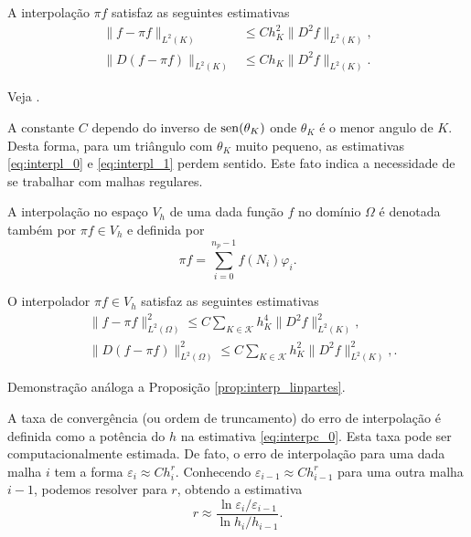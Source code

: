 \begin{prop}\label{prop:interpl}
  A interpolação $\pi f$ satisfaz as seguintes estimativas
  \begin{align}
    \|f - \pi f\|_{L^2(K)} &\leq Ch_K^2\|D^2f\|_{L^2(K)},\label{eq:interpl_0}\\
    \|D(f - \pi f)\|_{L^2(K)} &\leq Ch_K\|D^2 f\|_{L^2(K)}.\label{eq:interpl_1}
  \end{align}
\end{prop}
\begin{dem}
  Veja \cite[Capítulo 4]{Brenner2008a}.
\end{dem}

\begin{obs}
  A constante $C$ dependo do inverso de $\operatorname{sen}(\theta_K)$ onde $\theta_K$ é o menor angulo de $K$. Desta forma, para um triângulo com $\theta_K$ muito pequeno, as estimativas \eqref{eq:interpl_0} e \eqref{eq:interpl_1} perdem sentido. Este fato indica a necessidade de se trabalhar com malhas regulares.
\end{obs}

A interpolação no espaço $V_h$ de uma dada função $f$ no domínio $\Omega$ é denotada também por $\pi f\in V_h$ e definida por
\begin{equation}
  \pi f = \sum_{i=0}^{n_p-1} f(N_i)\varphi_i.
\end{equation}

\begin{prop}\label{prop:interpc}
  O interpolador $\pi f\in V_h$ satisfaz as seguintes estimativas
  \begin{align}
    &\|f - \pi f\|_{L^2(\Omega)}^2 \leq C\sum_{K\in\mathcal{K}} h_K^4\|D^2 f\|_{L^2(K)}^2,\label{eq:interpc_0}\\
    &\|D(f - \pi f)\|_{L^2(\Omega)}^2 \leq C\sum_{K\in\mathcal{K}} h_K^2\|D^2 f\|_{L^2(K)}^2,\label{eq:interpc_1}.
  \end{align}
\end{prop}
\begin{dem}
  Demonstração análoga a Proposição \ref{prop:interp_linpartes}.
\end{dem}

\begin{obs}
  A taxa de convergência (ou ordem de truncamento) do erro de interpolação é definida como a potência do $h$ na estimativa \eqref{eq:interpc_0}. Esta taxa pode ser computacionalmente estimada. De fato, o erro de interpolação para uma dada malha $i$ tem a forma $\varepsilon_i \approx Ch_i^{r}$. Conhecendo $\varepsilon_{i-1} \approx Ch_{i-1}^{r}$ para uma outra malha $i-1$, podemos resolver para $r$, obtendo a estimativa
  \begin{equation}\label{cap_mef2d_sec_interp:eq:conv_est}
    r \approx \frac{\ln{\varepsilon_i/\varepsilon_{i-1}}}{\ln{h_i/h_{i-1}}}.
  \end{equation}
\end{obs}

